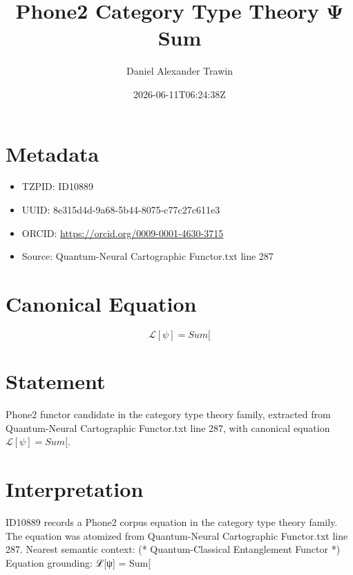 \documentclass[11pt]{article}
\title{Phone2 Category Type Theory Ψ Sum}
\author{Daniel Alexander Trawin}
\date{2026-06-11T06:24:38Z}
\begin{document}
\maketitle
\section*{Metadata}
\begin{itemize}
\item TZPID: ID10889
\item UUID: 8e315d4d-9a68-5b44-8075-c77c27c611e3
\item ORCID: \url{https://orcid.org/0009-0001-4630-3715}
\item Source: Quantum-Neural Cartographic Functor.txt line 287
\end{itemize}
\section*{Canonical Equation}
\[
ℒ[ψ] = Sum[
\]
\section*{Statement}
Phone2 functor candidate in the category type theory family, extracted from Quantum-Neural Cartographic Functor.txt line 287, with canonical equation $ℒ[ψ] = Sum[$.
\section*{Interpretation}
ID10889 records a Phone2 corpus equation in the category type theory family. The equation was atomized from Quantum-Neural Cartographic Functor.txt line 287. Nearest semantic context: (* Quantum-Classical Entanglement Functor *) Equation grounding: ℒ[ψ] = Sum[
\end{document}
